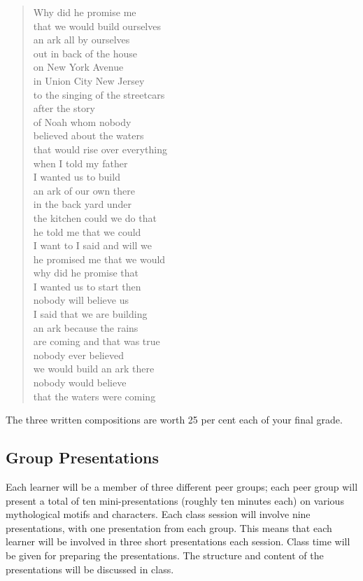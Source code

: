 \documentclass[10pt,DIV09,letterpaper,oneside,headsepline]{scrreprt}
\begin{document}
\begin{verse}
Why did he promise me\\
that we would build ourselves\\
an ark all by ourselves\\
out in back of the house\\
on New York Avenue\\
in Union City New Jersey\\
to the singing of the streetcars\\
after the story\\
of Noah whom nobody\\
believed about the waters\\
that would rise over everything\\
when I told my father\\
I wanted us to build\\
an ark of our own there\\
in the back yard under\\
the kitchen could we do that\\
he told me that we could\\
I want to I said and will we\\
he promised me that we would\\
why did he promise that\\
I wanted us to start then\\
nobody will believe us\\
I said that we are building\\
an ark because the rains\\
are coming and that was true\\
nobody ever believed\\
we would build an ark there\\
nobody would believe\\
that the waters were coming\\
\end{verse}

The three written compositions are worth 25 per cent each of your
final grade.

\subsection{Group Presentations}

Each learner will be a member of three different peer groups; each
peer group will present a total of ten mini-presentations (roughly ten minutes each) on various mythological motifs and characters. Each
class session will involve nine presentations, with one presentation
from each group. This means that each learner will be involved in
three short presentations each session. Class time will be given for
preparing the presentations. The structure and content of the
presentations will be discussed in class.
\end{document}
